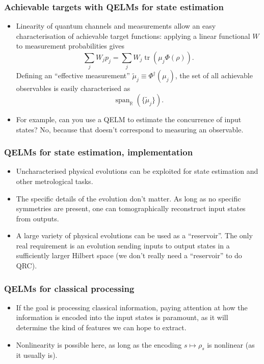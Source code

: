 \documentclass{beamer}
\begin{document}
\begin{frame}
\frametitle{Achievable targets with QELMs for state estimation}

\begin{itemize}
    \item Linearity of quantum channels and measurements allow an easy characterisation of achievable target functions: applying a linear functional $W$ to measurement probabilities gives
    \begin{equation}
        \sum_j W_j p_j = \sum_j W_j \operatorname{tr}(\mu_j \Phi(\rho)).
    \end{equation}
    Defining an ``effective measurement'' $\tilde\mu_j\equiv \Phi^\dagger(\mu_j)$, the set of all achievable observables is easily characterised as
    \begin{equation}
        \operatorname{span}_{\mathbb{R}}(\{\tilde\mu_j\}).
    \end{equation}
    \item For example, can you use a QELM to estimate the concurrence of input states? No, because that doesn't correspond to measuring an observable.
\end{itemize}

\end{frame}



\begin{frame}
\frametitle{QELMs for state estimation, implementation}

\begin{itemize}
    \item Uncharacterised physical evolutions can be exploited for state estimation and other metrological tasks.
    \item The specific details of the evolution don't matter. As long as no specific symmetries are present, one can tomographically reconstruct input states from outputs.
    \item A large variety of physical evolutions can be used as a ``reservoir''. The only real requirement is an evolution sending inputs to output states in a sufficiently larger Hilbert space (we don't really need a ``reservoir'' to do QRC).
\end{itemize}

\end{frame}


\begin{frame}
\frametitle{QELMs for classical processing}

\begin{itemize}
    \item If the goal is processing classical information, paying attention at how the information is encoded into the input states is paramount, as it will determine the kind of features we can hope to extract.
    \item Nonlinearity is possible here, as long as the encoding $s\mapsto \rho_s$ is nonlinear (as it usually is).
\end{itemize}

\end{frame}
\end{document}
